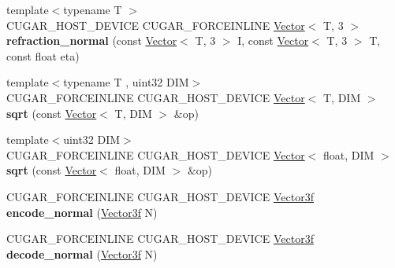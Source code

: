 \begin{DoxyCompactItemize}
\item 
\mbox{\label{namespacecugar_a223b405acfc7299e4583883dfe6713da}} 
{\footnotesize template$<$typename T $>$ }\\C\+U\+G\+A\+R\+\_\+\+H\+O\+S\+T\+\_\+\+D\+E\+V\+I\+CE C\+U\+G\+A\+R\+\_\+\+F\+O\+R\+C\+E\+I\+N\+L\+I\+NE \hyperlink{structcugar_1_1_vector}{Vector}$<$ T, 3 $>$ {\bfseries refraction\+\_\+normal} (const \hyperlink{structcugar_1_1_vector}{Vector}$<$ T, 3 $>$ I, const \hyperlink{structcugar_1_1_vector}{Vector}$<$ T, 3 $>$ T, const float eta)
\item 
\mbox{\label{namespacecugar_af35f5ded025795e3e8fc4a87b448f95e}} 
{\footnotesize template$<$typename T , uint32 D\+IM$>$ }\\C\+U\+G\+A\+R\+\_\+\+F\+O\+R\+C\+E\+I\+N\+L\+I\+NE C\+U\+G\+A\+R\+\_\+\+H\+O\+S\+T\+\_\+\+D\+E\+V\+I\+CE \hyperlink{structcugar_1_1_vector}{Vector}$<$ T, D\+IM $>$ {\bfseries sqrt} (const \hyperlink{structcugar_1_1_vector}{Vector}$<$ T, D\+IM $>$ \&op)
\item 
\mbox{\label{namespacecugar_a64f49be63359445738c18dee1a0db670}} 
{\footnotesize template$<$uint32 D\+IM$>$ }\\C\+U\+G\+A\+R\+\_\+\+F\+O\+R\+C\+E\+I\+N\+L\+I\+NE C\+U\+G\+A\+R\+\_\+\+H\+O\+S\+T\+\_\+\+D\+E\+V\+I\+CE \hyperlink{structcugar_1_1_vector}{Vector}$<$ float, D\+IM $>$ {\bfseries sqrt} (const \hyperlink{structcugar_1_1_vector}{Vector}$<$ float, D\+IM $>$ \&op)
\item 
\mbox{\label{namespacecugar_a056602bb03ab793f2f18616396138ce0}} 
C\+U\+G\+A\+R\+\_\+\+F\+O\+R\+C\+E\+I\+N\+L\+I\+NE C\+U\+G\+A\+R\+\_\+\+H\+O\+S\+T\+\_\+\+D\+E\+V\+I\+CE \hyperlink{structcugar_1_1_vector}{Vector3f} {\bfseries encode\+\_\+normal} (\hyperlink{structcugar_1_1_vector}{Vector3f} N)
\item 
\mbox{\label{namespacecugar_ad7e90885e1f6bec295aa7e41fe88fc6f}} 
C\+U\+G\+A\+R\+\_\+\+F\+O\+R\+C\+E\+I\+N\+L\+I\+NE C\+U\+G\+A\+R\+\_\+\+H\+O\+S\+T\+\_\+\+D\+E\+V\+I\+CE \hyperlink{structcugar_1_1_vector}{Vector3f} {\bfseries decode\+\_\+normal} (\hyperlink{structcugar_1_1_vector}{Vector3f} N)
\item 
\mbox{\label{namespacecugar_af39dae1269e90c41944e949af9a9b4b1}} 

\end{DoxyCompactItemize}
